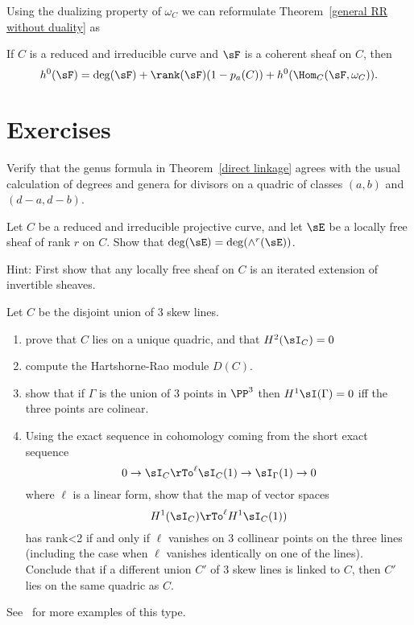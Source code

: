 Using the dualizing property of $\omega_C$ we can reformulate Theorem~\ref{general RR without duality} as
\begin{theorem}\label{general RR with duality}
If $C$ is a reduced and irreducible curve and $\sF$ is a coherent sheaf on $C$, then
$$
h^0(\sF) = \deg(\sF) + \rank(\sF)(1-p_a(C)) + h^0(\Hom_C(\sF, \omega_C)).
$$
\end{theorem}



\section{Exercises}

\begin{exercise}
 Verify that the genus formula in Theorem~\ref{direct linkage} agrees with the usual calculation of degrees and genera for divisors on a quadric of
 classes $(a,b)$ and $(d-a, d-b)$.
\end{exercise}

\begin{exercise}
 Let $C$ be a reduced and irreducible projective curve, and let $\sE$ be a locally free sheaf of rank $r$ on $C$. Show that
 $\deg(\sE) = \deg(\wedge^r(\sE))$.
 
 Hint: First show that any locally free sheaf on $C$ is an iterated extension of invertible sheaves.
\end{exercise}

\begin{exercise}
Let $C$ be the disjoint union of 3 skew lines. 
\begin{enumerate}
 \item prove that $C$ lies on a unique quadric, and that $H^2(\sI_C) = 0$
 \item compute the Hartshorne-Rao module $D(C)$.
 \item show that if $\Gamma$ is the union of 3 points in $\PP^3$ then
 $H^1\sI(\Gamma) = 0$ iff the three points are colinear.
 \item Using the exact sequence in cohomology coming from the short exact sequence
$$
0\to \sI_C \rTo^{\ell} \sI_C(1) \to \sI_\Gamma(1) \to 0
$$
where $\ell$ is a linear form, show that the map of vector spaces
$$
H^1(\sI_C) \rTo^{\ell} H^1\sI_C(1))
$$
has rank<2 if and only if $\ell$ vanishes on 3 collinear points on the three lines (including the case when $\ell$ vanishes identically on one of the lines).
Conclude that if a different union $C'$ of 3 skew lines is linked to $C$, then $C'$ lies on the same quadric as $C$.
\end{enumerate}
See~\cite{Migliore} for more examples of this type.
\end{exercise}

